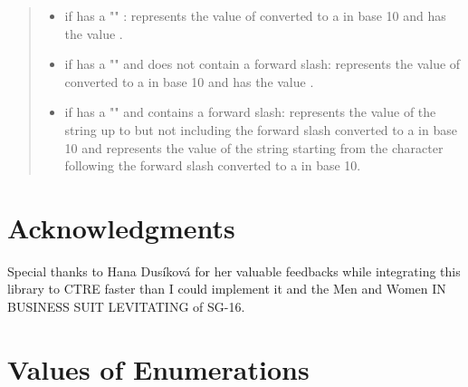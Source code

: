 \documentclass{wg21}
\begin{document}
\begin{quote}
\begin{itemdescr}
\begin{itemize}
    \item if  has a ""    :  represents the value of  converted to a  in base 10 and  has the value .
    \item if  has a ""  and  does not contain a forward slash:  represents the value of  converted to a  in base 10 and  has the value .
    \item if  has a ""  and  contains a forward slash:  represents the value of the  string up to but not including the forward slash converted to a  in base 10 and   represents the value of the  string starting from the character following the forward slash converted to a  in base 10.
\end{itemize}

\end{itemdescr}


\end{quote}


\section{Acknowledgments}

Special thanks to Hana Dusíková for her valuable feedbacks while integrating this library to CTRE faster than I could implement it and the Men and Women IN BUSINESS SUIT LEVITATING of SG-16.



\section{Values of Enumerations}
\end{document}
